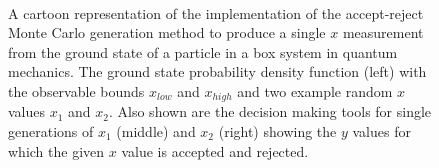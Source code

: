 \documentclass[UKenglish,texlive=2016]{\ATLASLATEXPATH atlasdoc}
\begin{document}
\begin{figure}[h]
 \centering
{} \\
 \caption{A cartoon representation of the implementation of the accept-reject Monte Carlo generation method to produce a single $x$ measurement from the ground state of a particle in a box system in quantum mechanics.  The ground state probability density function (left) with the observable bounds $x_{low}$ and $x_{high}$ and two example random $x$ values $x_1$ and $x_2$.  Also shown are the decision making tools for single generations of $x_1$ (middle) and $x_2$ (right) showing the $y$ values for which the given $x$ value is accepted and rejected.}
 \label{fig:particle_in_box_acceptreject}
\end{figure}
\end{document}
